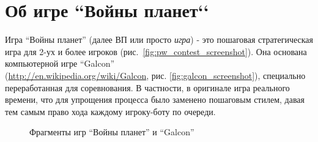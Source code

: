 \documentclass[12pt]{report}
\begin{document}
\section{Об игре ``Войны планет‘‘}
Игра ``Войны планет'' (далее ВП или просто \emph{игра}) - это пошаговая стратегическая игра для 2-ух и более игроков (рис.~\ref{fig:pw_contest_screenshot}). Она основана компьютерной игре ``Galcon'' \\(\url{http://en.wikipedia.org/wiki/Galcon}, рис. \ref{fig:galcon_screenshot}), специально переработанная для соревнования. В частности, в оригинале игра реального времени, что для упрощения процесса было заменено пошаговым стилем, давая тем самым право хода каждому игроку-боту по очереди.
\begin{figure}[h]
	\centering
	\hspace{0.5cm}
	\caption{Фрагменты игр ``Войны планет''  и ``Galcon'' }
	\label{fig:pw_screenshot}
\end{figure}
\end{document}
